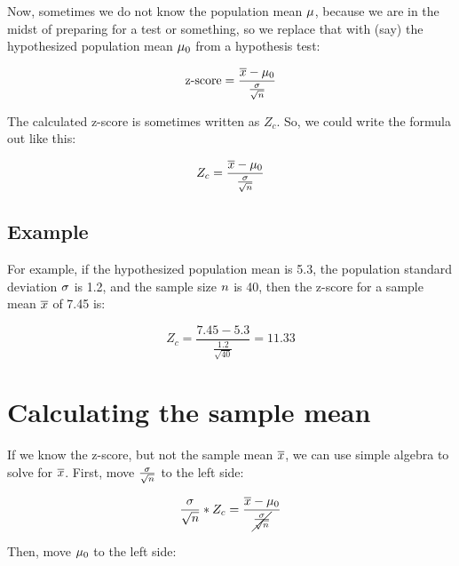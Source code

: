 \documentclass[../../../main.tex]{subfiles}
\begin{document}
\noindent
Now, sometimes we do not know the population mean $\mu$, because we are in the midst of preparing for a test or something, so we replace that with (say) the hypothesized population mean $\HypPopMean/$ from a hypothesis test:

\begin{equation*}
  \text{z-score} = \frac{\samplemean{x} - \HypPopMean/}{\frac{\populationstdev}{\sqrt{\samplesize/}}}
\end{equation*}

\noindent
The calculated z-score is sometimes written as $Z_{c}$. So, we could write the formula out like this:

\begin{equation*}
  Z_{c} = \frac{\samplemean{x} - \HypPopMean/}{\frac{\populationstdev}{\sqrt{\samplesize/}}}
\end{equation*}


\subsection{Example}

For example, if the hypothesized population mean is 5.3, the population standard deviation $\sigma$ is 1.2, and the sample size $\samplesize/$ is 40, then the z-score for a sample mean $\overline{x}$ of 7.45 is:

\begin{equation*}
  Z_{c} = \frac{7.45 - 5.3}{\frac{1.2}{\sqrt{40}}} = 11.33
\end{equation*}


\section{Calculating the sample mean}

If we know the z-score, but not the sample mean $\overline{x}$, we can use simple algebra to solve for $\overline{x}$. First, move $\frac{\sigma}{\sqrt{\samplesize/}}$ to the left side:

\begin{equation*}
  \frac{\sigma}{\sqrt{n}} * Z_{c} = \frac{\samplemean{x} - \HypPopMean/}{\cancel{\frac{\populationstdev}{\sqrt{\samplesize/}}}}
\end{equation*}

\noindent
Then, move $\HypPopMean/$ to the left side:
\end{document}
